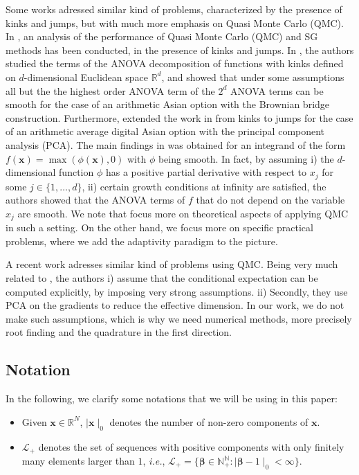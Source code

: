 \documentclass[11pt]{article}
\newcommand{\ie}{\emph{i.e.}}
\newcommand{\rset}{\mathbb{R}}
\newcommand{\nset}{\mathbb{N}}
\begin{document}
Some works \cite{griebel2013smoothing,bayersmoothing, griebel2017note,griewank2017high,xiao2018conditional} adressed similar kind of problems, characterized by the presence of kinks and jumps,  but with much more emphasis on Quasi Monte Carlo (QMC). In \cite{griebel2013smoothing, griebel2017note,griewank2017high}, an  analysis of the performance of  Quasi Monte Carlo (QMC) and SG methods has been conducted, in the presence of kinks and jumps.  In \cite{griebel2013smoothing,griebel2017note}, the authors studied the terms of the ANOVA decomposition of functions with kinks defined on $d$-dimensional Euclidean space $\rset^d$, and showed   that under some assumptions all but the the highest order ANOVA term  of the $2^d$ ANOVA terms can be smooth for the case of an arithmetic Asian option with the Brownian bridge construction. Furthermore, \cite{griewank2017high} extended the work in \cite{griebel2013smoothing,griebel2017note} from kinks
to jumps for  the case of an arithmetic average digital Asian option with the principal component analysis (PCA). The main findings in \cite{griebel2013smoothing,griebel2017note} was obtained  for an  integrand  of the form $f(\mathbf{x}) = \max(\phi(\mathbf{x}), 0)$ with $\phi$ being smooth. In fact, by assuming  i) the $d$-dimensional function $\phi$ has a positive partial derivative with respect to $x_j$ for some $j \in \{1,\dots,d\}$, ii) certain growth conditions at infinity are satisfied, the authors showed that the ANOVA terms of $f$ that do not depend on the variable $x_j$ are smooth.   We note that \cite{griebel2013smoothing,griebel2017note,griewank2017high} focus  more on  theoretical aspects of applying QMC in such a setting. On the other hand, we focus more on  specific practical problems, where we add the adaptivity paradigm to the picture.

A recent work \cite{xiao2018conditional} adresses similar kind of problems using QMC. Being very much related to \cite{bayersmoothing}, the authors i) assume that the conditional expectation can be computed explicitly, by imposing very strong assumptions. ii) Secondly, they  use  PCA on the gradients to reduce the effective dimension. In our work, we do not make such assumptions, which is why we need numerical methods, more precisely root finding and the quadrature in the first direction.
\subsection{Notation}
In the following, we clarify some notations that we will be using in this paper:
\begin{itemize}
	\item Given $\mathbf{x} \in  \rset^N$, $\mid \mathbf{x} \mid_0$  denotes the number of non-zero components of $\mathbf{x}$.
	\item $\mathcal{L}_+$ denotes the set of sequences with positive components with only finitely many elements larger than $1$, \ie,  $\mathcal{L}_+=\{\boldsymbol{\beta}\in \nset_+^\nset: \mid \boldsymbol{\beta}-1\mid_0<\infty  \}$.
\end{itemize}
\end{document}
